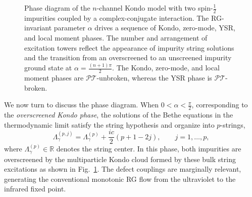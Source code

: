\documentclass[aps,  prb,twocolumn,
  superscriptaddress,  floatfix,  10pt         
]{revtex4-2}
\begin{document}
\begin{figure}
    \caption{
Phase diagram of the $n$-channel Kondo model with two spin-$\frac{1}{2}$ impurities coupled by a complex-conjugate interaction. The RG-invariant parameter $\alpha$ drives a sequence of Kondo, zero-mode, YSR, and local moment phases. The number and arrangement of excitation towers reflect the appearance of impurity string solutions and the transition from an overscreened to an unscreened impurity ground state at $\alpha=\frac{(n+1)\pi}{2}$. The Kondo, zero-mode, and local moment phases are $\mathscr{PT}$-unbroken, whereas the YSR phase is $\mathscr{PT}$-broken.
}
    \label{fig:phasediagram}
\end{figure}


We now turn to discuss the phase diagram. When $0<\alpha<\frac{\pi}{2}$, corresponding to the {\em{overscreened Kondo phase}}, the solutions of the Bethe equations in the thermodynamic limit satisfy the string hypothesis and organize into $p$-strings,
\begin{equation}
\Lambda_{\gamma}^{(p,j)}
=
\Lambda_{\gamma}^{(p)}
+
\frac{ic}{2}(p+1-2j),
\qquad
j=1,\ldots,p,
\end{equation}
where $\Lambda_{\gamma}^{(p)}\in\mathbb{R}$ denotes the string center. In this phase, both impurities are overscreened by the multiparticle Kondo cloud formed by these bulk string excitations as shown in Fig.~\ref{fig:phasediagram}. The defect couplings are marginally relevant, generating the conventional monotonic RG flow from the ultraviolet to the infrared fixed point.
\end{document}
